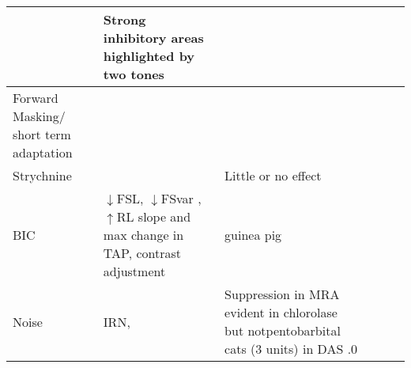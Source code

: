 \documentclass[10pt,a4paper]{article}
\begin{document}
\begin{flushleft}
\begin{supertabular}{|m{3.9609997cm}|m{2.9099998cm}|m{2.8739998cm}|m{2.846cm}|m{2.836cm}|m{2.839cm}|}
                        \citep{EvansZhao:1998}                          & Strong inhibitory areas highlighted by two tones
                     \citep{SpirouDavisEtAl:1999}                       &                                                                          & 
\citep{Geisler:1988,GoldsteinKiang:1968,Javel:1981,KimSiegelEtAl:1979,NomotoSugaEtAl:1964,SachsKiang:1968}\\\hline
                Forward Masking/ short term adaptation                  & 
\citep{BoettcherSalviEtAl:1990,Shore:1998,Shore:1995,ShoreBledsoe:1997} & 
                    \citep{BoettcherSalviEtAl:1990}                     &                                                                          & & \\\hline
                    Strychnine                                & 
                    \citep{PalombiCaspary:1992}                       
&                Little or no effect \citep{EvansZhao:1998}                & 

             \citep{DavisYoung:2000,SpirouDavisEtAl:1999}               &                                                                          & \\\hline
                                  BIC                                   & $\downarrow
$FSL, $\downarrow $FSvar ,$\uparrow $RL slope and
max\citep{PalombiCaspary:1992} change in TAP, contrast adjustment
                       \citep{EbertOstwald:1995}                        & guinea pig
              \citep{EvansZhao:1998,PalombiCaspary:1992}                & 
             \citep{DavisYoung:2000,SpirouDavisEtAl:1999}               &                                                                          & \\\hline
                                 Noise                                  & 
                  IRN,\citep{PalmerWallaceEtAl:2003}                    & \citep{ArnottWallaceEtAl:2004}
Suppression in MRA evident in chlorolase but notpentobarbital cats (3 units)
    \citep{Rhode:1994,RhodeSmith:1986} in DAS \citep{Joris:1998}.0      & 


\end{supertabular}
\end{flushleft}
\end{document}
